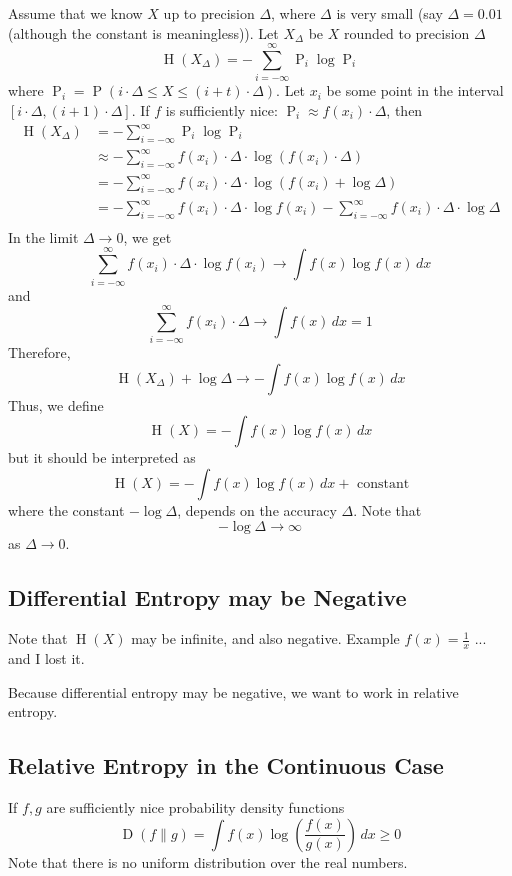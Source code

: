 \documentclass{article}
\begin{document}
Assume that we know $X$ up to precision $\Delta$, where $\Delta$ is very small (say $\Delta=0.01$ (although the constant is meaningless)). Let $X_\Delta$ be $X$ rounded to precision $\Delta$
\[
\operatorname{H}\left(X_\Delta\right) = -\sum_{i=-\infty}^{\infty} \operatorname{P}_i \log \operatorname{P}_i
\]
where $\operatorname{P}_i=\operatorname{P}\left(i\cdot \Delta \leq X\leq \left(i+t\right)\cdot \Delta\right)$. Let $x_i$ be some point in the interval $\left[i\cdot \Delta, \left(i+1\right)\cdot \Delta\right]$. If $f$ is sufficiently nice: $\operatorname{P}_i\approx f(x_i)\cdot \Delta$, then
\begin{align*}
    \operatorname{H}\left(X_\Delta\right) &= -\sum_{i=-\infty}^{\infty} \operatorname{P}_i \log \operatorname{P}_i\\
    &\approx -\sum_{i=-\infty}^{\infty} f(x_i)\cdot \Delta\cdot \log \left(f(x_i)\cdot \Delta\right)\\
    &= -\sum_{i=-\infty}^{\infty} f(x_i)\cdot \Delta\cdot \log \left(f(x_i) + \log \Delta\right)\\
    &= -\sum_{i=-\infty}^{\infty} f(x_i)\cdot \Delta\cdot \log f(x_i)-\sum_{i=-\infty}^{\infty} f(x_i)\cdot \Delta \cdot \log \Delta\\
\end{align*}
In the limit $\Delta\to 0$, we get 
\[
\sum_{i=-\infty}^{\infty} f(x_i)\cdot \Delta\cdot \log f(x_i) \to \int f(x)\log f(x)\, dx
\]
and 
\[
\sum_{i=-\infty}^{\infty} f(x_i)\cdot \Delta \to \int f(x)\, dx = 1
\]
Therefore,
\[
\operatorname{H}\left(X_\Delta\right) + \log\Delta \to -\int f(x) \log f(x) \, dx
\]
Thus, we define 
\[
\operatorname{H}(X) = -\int f(x)\log f(x) \, dx
\]
but it should be interpreted as 
\[
\operatorname{H}(X) = -\int f(x)\log f(x) \, dx + \text{ constant}
\]
where the constant $-\log\Delta$, depends on the accuracy $\Delta$. Note that 
\[
-\log \Delta \to \infty
\]
as $\Delta \to 0$.

\subsection{Differential Entropy may be Negative}

Note that $\operatorname{H}(X)$ may be infinite, and also negative. Example $f(x)= \frac{1}{x}$ ... and I lost it.

Because differential entropy may be negative, we want to work in relative entropy.

\subsection{Relative Entropy in the Continuous Case}

If $f,g$ are sufficiently nice probability density functions 
\[
\operatorname{D}\left(f\| g\right) = \int f(x) \log \left(\frac{f(x)}{g(x)}\right)\, dx \geq 0
\]
Note that there is no uniform distribution over the real numbers.
\end{document}
